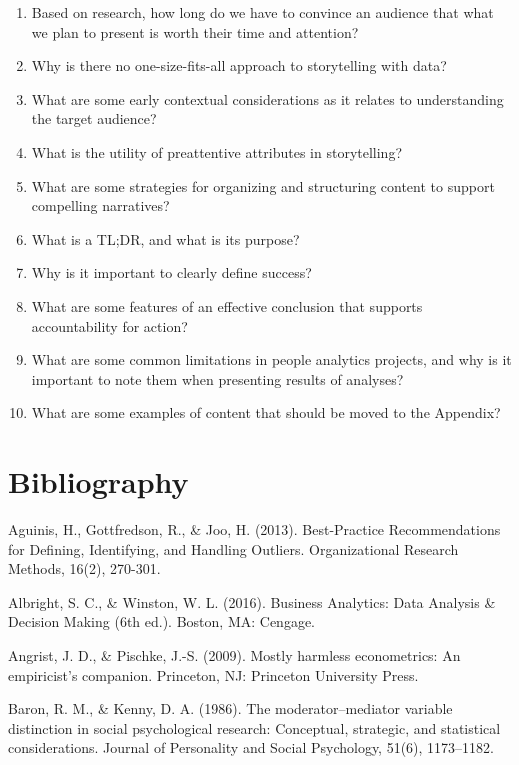 \documentclass[
]{book}
\begin{document}
\begin{enumerate}
\def\labelenumi{\arabic{enumi}.}
\item
  Based on research, how long do we have to convince an audience that what we plan to present is worth their time and attention?
\item
  Why is there no one-size-fits-all approach to storytelling with data?
\item
  What are some early contextual considerations as it relates to understanding the target audience?
\item
  What is the utility of preattentive attributes in storytelling?
\item
  What are some strategies for organizing and structuring content to support compelling narratives?
\item
  What is a TL;DR, and what is its purpose?
\item
  Why is it important to clearly define success?
\item
  What are some features of an effective conclusion that supports accountability for action?
\item
  What are some common limitations in people analytics projects, and why is it important to note them when presenting results of analyses?
\item
  What are some examples of content that should be moved to the Appendix?
\end{enumerate}

\hypertarget{bibli}{%
\chapter{Bibliography}\label{bibli}}

Aguinis, H., Gottfredson, R., \& Joo, H. (2013). Best-Practice Recommendations for Defining, Identifying, and Handling Outliers. Organizational Research Methods, 16(2), 270-301.

Albright, S. C., \& Winston, W. L. (2016). Business Analytics: Data Analysis \& Decision Making (6th ed.). Boston, MA: Cengage.

Angrist, J. D., \& Pischke, J.-S. (2009). Mostly harmless econometrics: An empiricist's companion. Princeton, NJ: Princeton University Press.

Baron, R. M., \& Kenny, D. A. (1986). The moderator--mediator variable distinction in social psychological research: Conceptual, strategic, and statistical considerations. Journal of Personality and Social Psychology, 51(6), 1173--1182.
\end{document}
